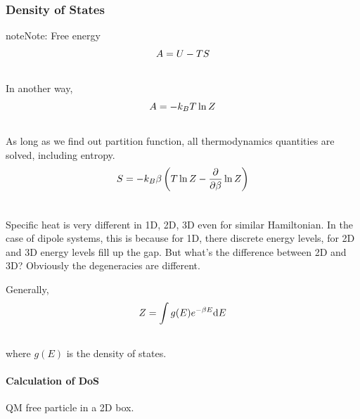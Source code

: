 \documentclass[letterpaper,10pt,english]{sphinxmanual}
\begin{document}
\subsubsection{Density of States}
\label{equilibrium/week2:density-of-states}
\begin{notice}{note}{Note:}
Free energy
\begin{gather}
\begin{split}A = U - T S\end{split}\notag\\\begin{split}\end{split}\notag
\end{gather}
In another way,
\begin{gather}
\begin{split}A = - k_B T \ln Z\end{split}\notag\\\begin{split}\end{split}\notag
\end{gather}
As long as we find out partition function, all thermodynamics quantities are solved, including entropy.
\begin{gather}
\begin{split}S = -k_B \beta  \left(T \ln Z - \frac{\partial}{\partial \beta} \ln Z \right)\end{split}\notag\\\begin{split}\end{split}\notag
\end{gather}\end{notice}

Specific heat is very different in 1D, 2D, 3D even for similar Hamiltonian. In the case of dipole systems, this is because for 1D, there discrete energy levels, for 2D and 3D energy levels fill up the gap. But what's the difference between 2D and 3D? Obviously the degeneracies are different.

Generally,
\begin{gather}
\begin{split}Z = \int g(E) e^{-\beta E}\mathrm d E\end{split}\notag\\\begin{split}\end{split}\notag
\end{gather}
where $g(E)$ is the density of states.


\paragraph{Calculation of DoS}
\label{equilibrium/week2:calculation-of-dos}
QM free particle in a 2D box.
\end{document}
